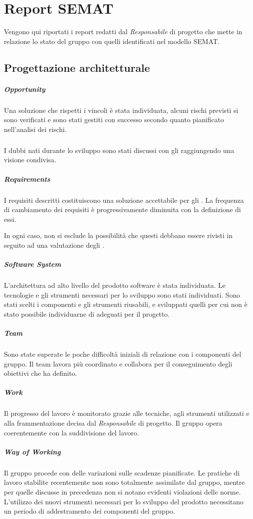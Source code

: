 \section{Report SEMAT}
Vengono qui riportati i report redatti dal \textit{Responsabile} di progetto che mette in relazione lo stato del gruppo con quelli identificati nel modello SEMAT.

\subsection{Progettazione architetturale}

	\subparagraph{Opportunity}
	Una soluzione che rispetti i vincoli è stata individuata, alcuni rischi previsti si sono verificati e sono stati gestiti con successo secondo quanto pianificato nell'analisi dei rischi.

	\subparagraph{}
	I dubbi nati durante lo sviluppo sono stati discussi con gli  raggiungendo una visione condivisa.

	\subparagraph{Requirements}
	I requisiti descritti costituiscono una soluzione accettabile per gli . La frequenza di cambiamento dei requisiti è progressivamente diminuita con la definizione di essi.

	In ogni caso, non si esclude la possibilità che questi debbano essere rivisti in seguito ad una valutazione degli .

	\subparagraph{Software System}
	L'architettura ad alto livello del prodotto software è stata individuata. Le tecnologie e gli strumenti necessari per lo sviluppo sono stati individuati. Sono stati scelti i componenti e gli strumenti riusabili, e sviluppati quelli per cui non è stato possibile individuarne di adeguati per il progetto.

	\subparagraph{Team}
	Sono state superate le poche difficoltà iniziali di relazione con i componenti del gruppo. Il team lavora più coordinato e collabora per il conseguimento degli obiettivi che ha definito.

	\subparagraph{Work}
	Il progresso del lavoro è monitorato grazie alle tecniche, agli strumenti utilizzati e alla frammentazione decisa dal \textit{Responsabile} di progetto. Il gruppo opera coerentemente con la suddivisione del lavoro.

	\subparagraph{Way of Working}
	Il gruppo procede con delle variazioni sulle scadenze pianificate. Le pratiche di lavoro stabilite recentemente non sono totalmente assimilate dal gruppo, mentre per quelle discusse in precedenza non si notano evidenti violazioni delle norme. L'utilizzo dei nuovi strumenti necessari per lo sviluppo del prodotto necessitano un periodo di addestramento dei componenti del gruppo.
	
	\newpage
